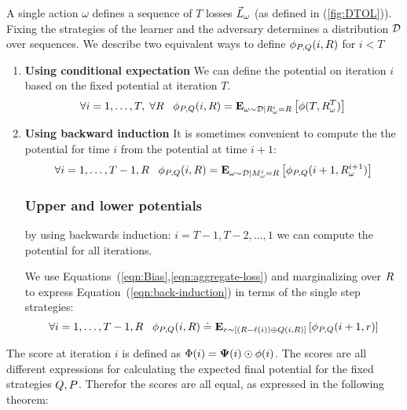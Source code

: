 \documentclass{article}[12pt]
\begin{document}
A single action $\omega$ defines a sequence of $T$ losses $\vec{L}_{\omega}$ (as defined in
(\ref{fig:DTOL})). Fixing the strategies of the learner and the
adversary determines a distribution ${\cal D}$ over sequences.  We describe two
equivalent ways to define $\phi_{P,Q}(i,R)$ for $i<T$
 \begin{enumerate}
 \item{\bf Using conditional expectation} We can define the potential
   on iteration $i$ based on the fixed potential at iteration $T$.
\begin{equation}
  \forall i=1,\ldots,T,\; \forall R \;\;\;
  \phi_{P,Q}(i,R)={\bf E}_{\omega\sim {\cal D}|R_\omega^i=R}\left[ \phi(T,R_{\omega}^T) \right]
\end{equation}
 \item{\bf Using backward induction} It is sometimes convenient to
   compute the the potential for time $i$ from the potential at time
   $i+1$:
   \begin{equation} \label{eqn:back-induction}
     \forall i=1,\ldots,T-1, R\;\;\;
     \phi_{P,Q}(i,R)={\bf E}_{\omega\sim {\cal D}|M_\omega^i=R}\left[ \phi_{P,Q}(i+1,R_{\omega}^{i+1}) \right]
   \end{equation}

\subsubsection{Upper and lower potentials} \label{sec:potentialRecursion}

   by using backwards induction: $i=T-1,T-2,\ldots,1$ we can compute the
potential for all iterations.


We use Equations~(\ref{eqn:Bias},\ref{eqn:aggregate-loss}) and
marginalizing over $R$ to express Equation~(\ref{eqn:back-induction})
in terms of the single step strategies:
\begin{equation} \label{eqn:induction}
  \forall i=1,\ldots,T-1, R\;\;\;
  \phi_{P,Q}(i,R) \doteq {\bf E}_{r \sim [(R-\ell(i)) \oplus Q(i,R)]}\left[ \phi_{P,Q}(i+1,r) \right]
\end{equation}

\end{enumerate}

The score at iteration $i$ is defined as
$\Phi(i)={\bf \Psi}(i)\odot \phi(i)$. The scores are all different
expressions for calculating the expected final potential for the fixed strategies
$Q, P$. Therefor the scores are all equal, as expressed
in the following theorem:
\end{document}
